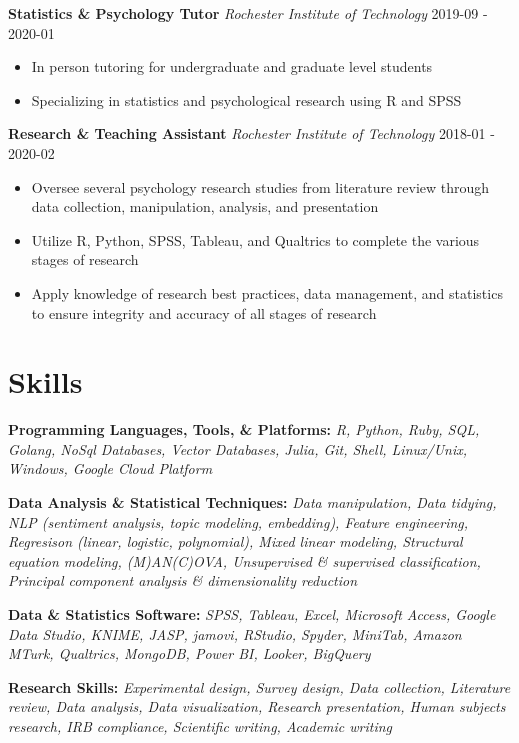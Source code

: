 \documentclass[a4paper,9pt]{extarticle}
\begin{document}
\noindent
\textbf{Statistics \& Psychology Tutor}
\noindent
\textit{Rochester Institute of Technology} \hfill 2019-09 - 2020-01
\begin{itemize}

\item In person tutoring for undergraduate and graduate level students
\item Specializing in statistics and psychological research using R and SPSS
\end{itemize}

\noindent
\textbf{Research \& Teaching Assistant}
\noindent
\textit{Rochester Institute of Technology} \hfill 2018-01 - 2020-02
\begin{itemize}

\item Oversee several psychology research studies from literature review through data collection, manipulation, analysis, and presentation
\item Utilize R, Python, SPSS, Tableau, and Qualtrics to complete the various stages of research
\item Apply knowledge of research best practices, data management, and statistics to ensure integrity and accuracy of all stages of research
\end{itemize}



\section*{Skills}

\noindent
\textbf{Programming Languages, Tools, \& Platforms:}
\textit{R, Python, Ruby, SQL, Golang, NoSql Databases, Vector Databases, Julia, Git, Shell, Linux/Unix, Windows, Google Cloud Platform}

\noindent
\textbf{Data Analysis \& Statistical Techniques:}
\textit{Data manipulation, Data tidying, NLP (sentiment analysis, topic modeling, embedding), Feature engineering, Regresison (linear, logistic, polynomial), Mixed linear modeling, Structural equation modeling, (M)AN(C)OVA, Unsupervised \& supervised classification, Principal component analysis \& dimensionality reduction}

\noindent
\textbf{Data \& Statistics Software:}
\textit{SPSS, Tableau, Excel, Microsoft Access, Google Data Studio, KNIME, JASP, jamovi, RStudio, Spyder, MiniTab, Amazon MTurk, Qualtrics, MongoDB, Power BI, Looker, BigQuery}

\noindent
\textbf{Research Skills:}
\textit{Experimental design, Survey design, Data collection, Literature review, Data analysis, Data visualization, Research presentation, Human subjects research, IRB compliance, Scientific writing, Academic writing}
\end{document}

